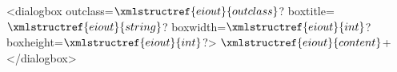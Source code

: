 <dialogbox outclass=$\xmlstructref{eiout}{outclass}$? boxtitle=$\xmlstructref{eiout}{string}$? boxwidth=$\xmlstructref{eiout}{int}$? boxheight=$\xmlstructref{eiout}{int}$?>
  $\xmlstructref{eiout}{content}$+
</dialogbox>
